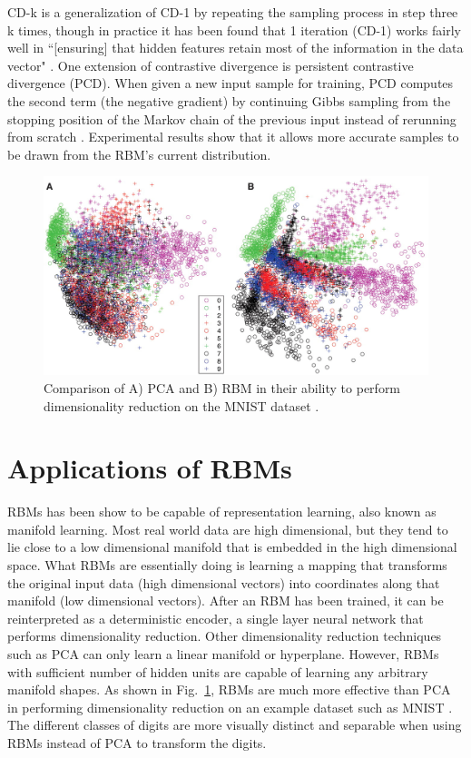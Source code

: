 \documentclass[journal]{IEEEtran}
\begin{document}
CD-k is a generalization of CD-1 by repeating the sampling process in step three k times, though in practice it has been found that 1 iteration (CD-1) works fairly well in ``[ensuring] that hidden features retain most of the information in the data vector" \cite{hinton2010practical}.  One extension of contrastive divergence is persistent contrastive divergence (PCD). When given a new input sample for training, PCD computes the second term (the negative gradient) by continuing Gibbs sampling from the stopping position of the Markov chain of the previous input instead of rerunning from scratch \cite{tieleman2008training}. Experimental results show that it allows more accurate samples to be drawn from the RBM's current distribution. 

\begin{figure}[h]
  \centering
  \includegraphics[width=0.9\linewidth]{reduce.jpg}
  \caption{Comparison of A) PCA and B) RBM in their ability to perform dimensionality reduction on the MNIST dataset \cite{hinton2006reducing}.}
  \label{reduce}
\end{figure}

\section{Applications of RBMs}
RBMs has been show to be capable of representation learning, also known as manifold learning. Most real world data are high dimensional, but they tend to lie close to a low dimensional manifold that is embedded in the high dimensional space. What RBMs are essentially doing is learning a mapping that transforms the original input data (high dimensional vectors) into coordinates along that manifold (low dimensional vectors). After an RBM has been trained, it can be reinterpreted as a deterministic encoder, a single layer neural network that performs dimensionality reduction. Other dimensionality reduction techniques such as PCA can only learn a linear manifold or hyperplane. However, RBMs with sufficient number of hidden units are capable of learning any arbitrary manifold shapes. As shown in Fig.~\ref{reduce}, RBMs are much more effective than PCA in performing dimensionality reduction on an example dataset such as MNIST \cite{deng2012mnist}. The different classes of digits are more visually distinct and separable when using RBMs instead of PCA to transform the digits. 
\end{document}
